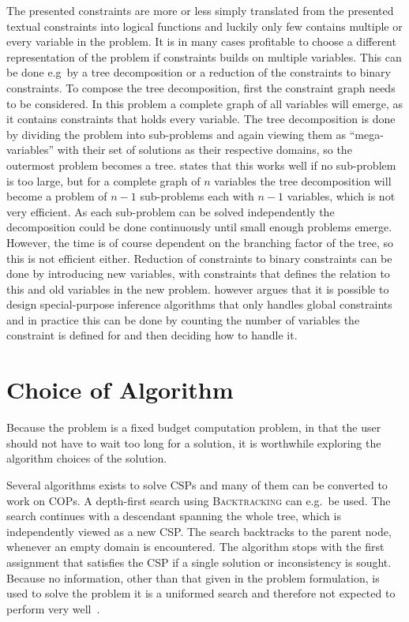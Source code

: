 The presented constraints are more or less simply translated from the presented textual constraints into logical functions and luckily only few contains multiple or every variable in the problem. It is in many cases profitable to choose a different representation of the problem if constraints builds on multiple variables. This can be done e.g\ by a tree decomposition or a reduction of the constraints to binary constraints. To compose the tree decomposition, first the constraint graph needs to be considered. In this problem a complete graph of all variables will emerge, as it contains constraints that holds every variable. The tree decomposition is done by dividing the problem into sub-problems and again viewing them as ``mega-variables'' with their set of solutions as their respective domains, so the outermost problem becomes a tree.  states that this works well if no sub-problem is too large, but for a complete graph of $n$ variables the tree decomposition will become a problem of $n-1$ sub-problems each with $n-1$ variables, which is not very efficient. As each sub-problem can be solved independently the decomposition could be done continuously until small enough problems emerge. However, the time is of course dependent on the branching factor of the tree, so this is not efficient either. Reduction of constraints to binary constraints can be done by introducing new variables, with constraints that defines the relation to this and old variables in the new problem.  however argues that it is possible to design special-purpose inference algorithms that only handles global constraints and in practice this can be done by counting the number of variables the constraint is defined for and then deciding how to handle it.

\section{Choice of Algorithm}
Because the problem is a fixed budget computation problem, in that the user should not have to wait too long for a solution, it is worthwhile exploring the algorithm choices of the solution.

Several algorithms exists to solve CSPs and many of them can be converted to work on COPs. A depth-first search using \textsc{Backtracking} can e.g.\ be used. The search continues with a descendant spanning the whole tree, which is independently viewed as a new CSP. The search backtracks to the parent node, whenever an empty domain is encountered. The algorithm stops with the first assignment that satisfies the CSP if a single solution or inconsistency is sought. Because no information, other than that given in the problem formulation, is used to solve the problem it is a uniformed search and therefore not expected to perform very well~.

